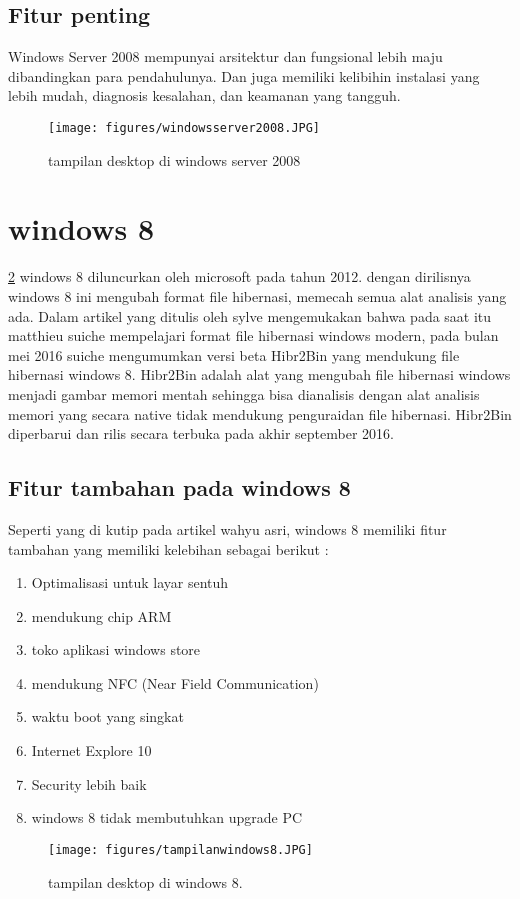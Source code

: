 	\subsection{Fitur penting}
	Windows Server 2008 mempunyai arsitektur dan fungsional lebih maju dibandingkan para pendahulunya. Dan juga memiliki kelibihin instalasi yang lebih mudah, diagnosis kesalahan, dan keamanan yang tangguh.

\begin{figure}[ht]
\centerline{\texttt{[image: figures/windowsserver2008.JPG]}}
\caption{tampilan desktop di windows server 2008}
\label{windowsserver2008}
\end{figure}
	\section{windows 8}
		\ref{tampilanwindows8} windows 8 diluncurkan oleh microsoft pada tahun 2012. dengan dirilisnya windows 8 ini mengubah format file hibernasi, memecah semua alat analisis yang ada.
		Dalam artikel yang ditulis oleh sylve mengemukakan bahwa pada saat itu matthieu suiche mempelajari format file hibernasi windows modern, pada bulan mei 2016 suiche mengumumkan versi beta Hibr2Bin yang mendukung file hibernasi windows 8. Hibr2Bin adalah alat yang mengubah file hibernasi windows menjadi gambar memori mentah sehingga bisa dianalisis dengan alat analisis memori yang secara native tidak mendukung penguraidan file hibernasi. Hibr2Bin diperbarui dan rilis secara terbuka pada akhir september 2016. \cite{sylve2017modern}
		\subsection{Fitur tambahan pada windows 8}
			Seperti yang di kutip pada artikel wahyu asri, windows 8 memiliki fitur tambahan yang memiliki kelebihan sebagai berikut :
\begin{enumerate}
			\item Optimalisasi untuk layar sentuh
			\item mendukung chip ARM
			\item toko aplikasi windows store
			\item mendukung NFC (Near Field Communication)
			\item waktu boot yang singkat
			\item Internet Explore 10
			\item Security lebih baik
			\item windows 8 tidak membutuhkan upgrade PC \cite{wahyu8review}
\end{enumerate}
\begin{figure}[ht]
\centerline{\texttt{[image: figures/tampilanwindows8.JPG]}}
\caption{tampilan desktop di windows 8.}
\label{tampilanwindows8}
\end{figure}


